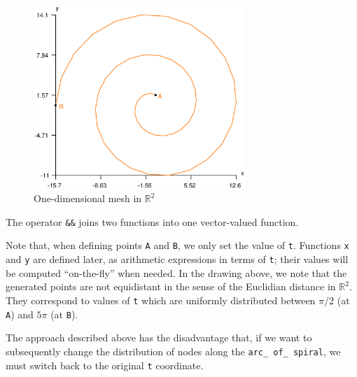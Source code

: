 \begin{figure}[ht] \centering
  \includegraphics[width=80mm]{spiral}
  \caption{One-dimensional mesh in $ {\mathbb R}^2 $}
  \label{\numb section 2.\numb fig 20}
\end{figure}

The operator {\small\tt \&\&} joins two functions into one vector-valued function.

Note that, when defining points {\small\tt A} and {\small\tt B}, we only set the value of
{\small\tt t}.
Functions {\small\tt x} and {\small\tt y} are defined later, as arithmetic expressions in terms of
{\small\tt t}; their values will be computed ``on-the-fly'' when needed.
In the drawing above, we note that the generated points are not equidistant in the sense of the
Euclidian distance in $ \mathbb{R}^2 $.
They correspond to values of {\small\tt t} which are uniformly distributed between
$ \pi/2 $ (at {\small\tt A}) and $ 5\pi $ (at {\small\tt B}).

The approach described above has the disadvantage that, if we want to subsequently change the
distribution of nodes along the {\small\tt arc\_\,of\_\,spiral}, we must switch back to the original
{\small\tt t} coordinate.

